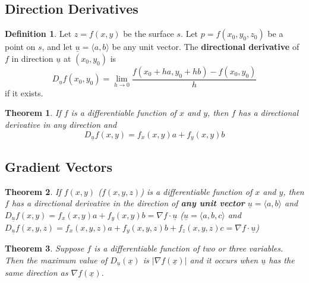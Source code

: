 \documentclass[12 pt]{article}
\newtheorem{thm}{Theorem}
\theoremstyle{definition}
\newtheorem{defn}{Definition}
\begin{document}
\subsection{Direction Derivatives}
\begin{defn}
  Let $z=f(x,y)$ be the surface $s$. Let $p=f(x_0,y_0,z_0)$ be a point on $s$, and let $\underline{u}=\langle a, b \rangle $ be any unit vector. The \textbf{directional derivative} of $f$ in direction $\underline{u}$ at $(x_0,y_0)$ is
  $$D_{\underline{u}}f(x_0,y_0)=\lim_{h \to 0}\frac{f(x_0+ha,y_0+hb)-f(x_0,y_0)}{h}$$ if it exists.

\end{defn}
\begin{thm}
  If $f$ is a differentiable function of $x$ and $y$, then $f$ has a directional derivative in any direction and
  $$ D_{\underline{u}}f(x,y)=f_x(x,y)a+f_y(x,y)b$$
\end{thm}
\subsection{Gradient Vectors}
\begin{thm}
  If ${f(x,y)}$ ($f(x,y,z)$) is a differentiable function of $x$ and $y$, then $f$ has a directional derivative in the direction of \textbf{any unit vector} $\underline{u}=\langle a, b \rangle$ and $D_{\underline{u}}f(x,y)=f_x(x,y)a+f_y(x,y)b=\nabla f \cdot \underline{u}$ ($\underline{u}=\langle a, b, c \rangle$ and $D_{\underline{u}}f(x,y,z)=f_x(x,y,z)a+f_y(x,y,z)b+f_z(x,y,z)c = \nabla f \cdot \underline{u}$)
\end{thm}
\begin{thm}
  Suppose $f$ is a differentiable function of two or three variables. Then the maximum value of $D_{\underline{u}}(\underline{x})$ is $|\nabla f(\underline{x})|$ and it occurs when $\underline{u}$ has the same direction as $\nabla f(\underline{x})$.
\end{thm}
\end{document}
